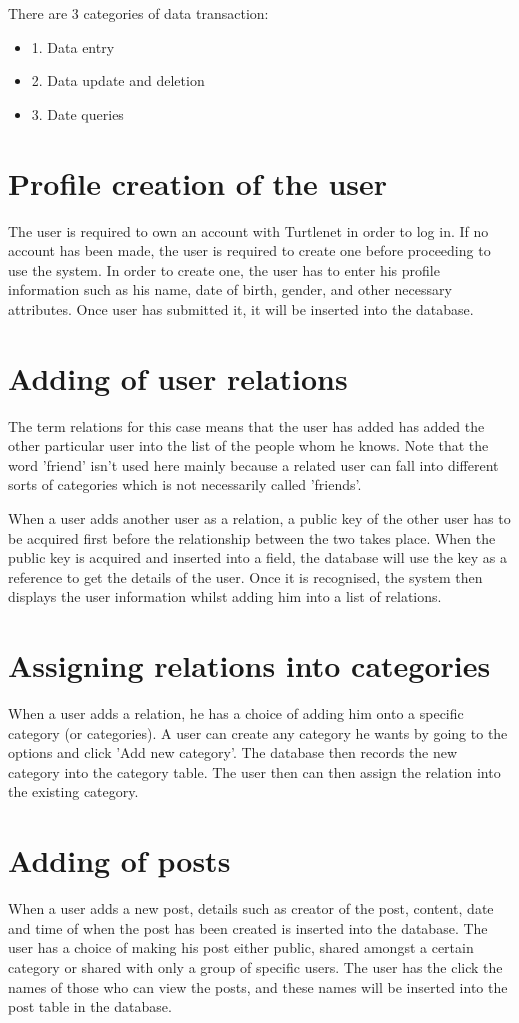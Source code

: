 There are 3 categories of data transaction:
\begin{itemize}
\item 1. Data entry
\item 2. Data update and deletion
\item 3. Date queries
\end{itemize}

\section{Profile creation of the user}
The user is required to own an account with Turtlenet in order to log in. If
no account has been made, the user is required to create one before proceeding
to use the system. In order to create one, the user has to enter his profile
information such as his name, date of birth, gender, and other necessary
attributes. Once user has submitted it, it will be inserted into the database.

\section{Adding of user relations}
The term relations for this case means that the user has added has added the
other particular user into the list of the people whom he knows. Note that the
word 'friend' isn't used here mainly because a related user can fall into
different sorts of categories which is not necessarily called 'friends'.

When a user adds another user as a relation, a public key of the other user has
to be acquired first before the relationship between the two takes place. When
the public key is acquired and inserted into a field, the database will use the
key as a reference to get the details of the user. Once it is recognised, the
system then displays the user information whilst adding him into a list of
relations.

\section{Assigning relations into categories}
When a user adds a relation, he has a choice of adding him onto a specific
category (or categories). A user can create any category he wants by going to
the options and click 'Add new category'. The database then records the new
category into the category table.  The user then can then assign the relation
into the existing category. 

\section{Adding of posts}
When a user adds a new post, details such as creator of the post, content, date
and time of when the post has been created is inserted into the database. The
user has a choice of making his post either public, shared amongst a certain
category or shared with only a group of specific users. The user has the click
the names of those who can view the posts, and these names will be inserted into
the post table in the database.

